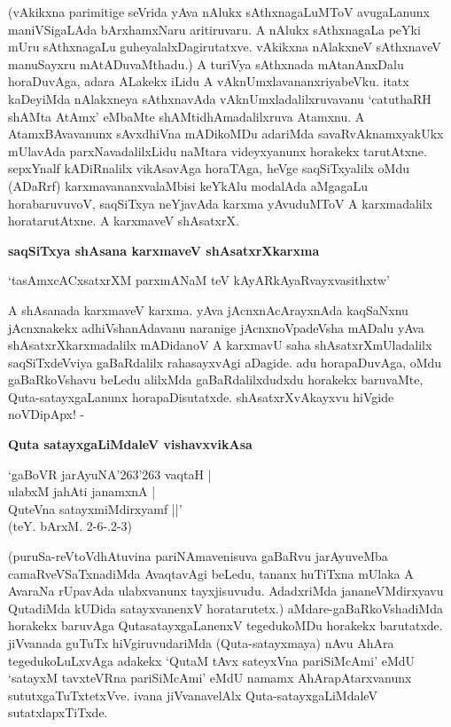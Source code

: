 \noindent
(vAkikxna parimitige seVrida yAva nAlukx sAthxnagaLuMToV avugaLanunx maniVSi\-gaLAda bArxhamxNaru ari\-tiru\-varu. A nAlukx sAthxnagaLa peYki mUru sAthxnagaLu guhe\-yalalxDagirutatxve. vAkikxna nAlakxneV sAthxnaveV manuSayxru mAtADuvaMthadu.) A turiVya sAthxnada mAtanAnxDalu horaDuvAga, adara ALakekx iLidu A vAknUmxla\-vananxriyabeVku. itatx kaDeyiMda nAlakxneya sAthxnavAda vAknUmxladalilxruvavanu `catuthaRH shAMta AtAmx' eMbaMte shAMtidhAmadalilxruva Atamxnu. A AtamxBAvavanunx sAvxdhiVna mADikoMDu adariMda savaRvAknamxyakUkx mUlavAda parxNavadalilxLidu naMtara videyxyanunx horakekx tarutAtxne. sepxYnalf kADiR\-nalilx vikAsavAga horaTAga, heVge saqSiTxyalilx oMdu (ADaRrf) karxmavananxvalaMbisi keYkAlu moda\-lAda aMga\-gaLu horabaruvuvoV, saqSiTxya neYjavAda karxma yAvuduMToV A karxmadalilx horatarutAtxne. A karxmaveV shAsatxrX.

{\bigskip
\noindent
{\large\bf saqSiTxya shAsana karxmaveV shAsatxrXkarxma}}\label{page87}
\smallskip

\begin{shloka}
`tasAmxcACxsatxrXM parxmANaM teV kAyARkAyaRvayxvasithxtw'\label{87}
\end{shloka}

\noindent
A shAsanada karxmaveV karxma. yAva jAcnxnAcArayxnAda kaqSaNxnu jAcnxnakekx adhiVshanAdavanu naranige jAcnxnoV\-padeVsha mADalu yAva shAsatxrXkarxmadalilx mADidanoV A karxmavU saha shAsatxrXmUladalilx saqSiTxdeVviya gaBaR\-dalilx rahasayxvAgi aDagide. adu horapaDuvAga, oMdu gaBaRkoVshavu beLedu alilxMda gaBaRdalilx\-dudxdu horakekx baruvaMte, Quta-satayxgaLanunx horapaDisutatxde. shAsatxrXvAkayxvu hiVgide noVDipApx! - 

{\bigskip
\noindent
{\large\bf Quta satayxgaLiMdaleV vishavxvikAsa}}\label{page87}
\medskip

\begin{shloka}
`gaBoVR jarAyuNA\char'263\char'263 vaqtaH |\\\label{87}
ulabxM ja{hA}ti janamxnA |\\
QuteVna satayxmiMdirxyamf ||'\\
\hfill{(teY. bArxM. 2-6-.2-3)}
\end{shloka}

\noindent
(puruSa-reVtoVdhAtuvina pariNAmavenisuva gaBaRvu jarAyuveMba camaR\-veVSaTxnadiMda Avaqta\-vAgi beLedu, tananx huTiTxna mUlaka A AvaraNa rUpavAda ulabxvanunx tayxjisuvudu. AdadxriMda jananeVMdirx\-yavu QutadiMda kUDida satayx\-vanenxV horatarutetx.) aMdare-gaBaRkoVshadiMda horakekx baruvAga Quta\-satayx\-gaLanenxV tegedu\-koMDu horakekx barutatxde. jiVvanada guTuTx hiVgiruvudariMda (Quta-satayxmaya) nAvu AhAra tegedukoLuLxvAga adakekx `QutaM tAvx sateyxVna pariSiMcAmi' eMdU `satayxM tavxteVRna pariSiM\-cAmi'\label{87} eMdU namamx AhArapAtarxvanunx sututxgaTuTxtetxVve. ivana jiVvanavelAlx Quta-satayxgaLiMdaleV sutatx\-lapxTiTxde.

